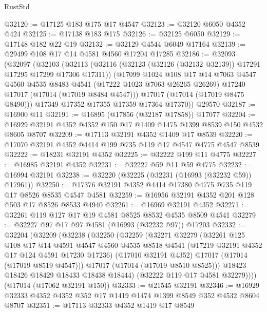 \begin{lexlean}{RustStd}
\begin{coremodule}
@32120 := @17125 @183 @175 @17 @4547
@32123 := @32120 @6050 @4352 @424
@32125 := @17138 @183 @175
@32126 := @32125 @6050
@32129 := @17148 @182 @22 @19
@32132 := @32129 @4544 @6049 @17164
@32139 := @29499 @108 @17 @14 @4581 @4560 @17204 @17285
@32186 := @32093
    (@32097
      (@32103
        (@32113
          (@32116 (@32123 (@32126 (@32132 @32139)) @17291 @17295 @17299 @17306 @17311))
          (@17099
            @1024
            @108
            @17
            @14
            @7063
            @4547
            @4560
            @4535
            @8483
            @4541
            (@17222 @1023 @7063 @26265 @26269)
            @17240
            @17017
            (@17014 (@17019 @8484 @4547)))
          @17017
          (@17014 (@17019 @8475 @8490)))
        @17349
        @17352
        @17355
        @17359
        @17364
        @17370))
    @29570
@32187 := @16900 @11
@32191 := @16895 (@17856 (@32187 @17858)) @17077
@32204 := @16929 @32191 @4352 @4352 @150 @17 @1409 @1475 @1399 @8539 @150 @4532 @8605 @8707
@32209 := @17113 @32191 @4352 @1409 @17 @8539
@32220 := @17070 @32191 @4352 @4414 @199 @735 @119 @17 @4547 @4775 @4547 @8539
@32222 := @18231 @32191 @4352
@32225 := @32222 @199 @11 @4775
@32227 := @16985 @32191 @4352
@32231 := @32227 @59 @11 @59 @4775
@32232 := @16994 @32191
@32238 := @32220 (@32225 (@32231 (@16993 (@32232 @59)) @17961))
@32250 := @17376 @32191 @4352 @4414 @17380 @4775 @735 @119 @17 @8526 @8535 @4547 @4581
@32259 := @16956 @32191 @4352 @201 @128 @503 @17 @8526 @8533 @4940
@32261 := @16969 @32191 @4352
@32271 := @32261 @119 @127 @17 @19 @4581 @8525 @8532 @4535 @8509 @4541
@32279 := @32227 @97 @17 @97 @4581 (@16993 (@32232 @97)) @17203
@32332 := @32204
    (@32209
      (@32238
        (@32250
          (@32259
            (@32271
              @32279
              (@32261
                @125
                @108
                @17
                @14
                @4591
                @4547
                @4560
                @4535
                @8518
                @4541
                (@17219 @32191 @4352 @17 @124 @4591 @17230 @17236)
                (@17010 @32191 @4352)
                @17017
                (@17014 (@17019 @8519 @4547)))
              @17017
              (@17014 (@17019 @8510 @8525)))
            @18423
            @18426
            @18429
            @18433
            @18438
            @18444)
          (@32222 @119 @17 @4581 @32279))))
    (@17014 (@17062 @32191 @150))
@32333 := @21545 @32191
@32346 := @16929 @32333 @4352 @4352 @352 @17 @1419 @1474 @1399 @8549 @352 @4532 @8604 @8707
@32351 := @17113 @32333 @4352 @1419 @17 @8549

\end{coremodule}
\end{lexlean}
